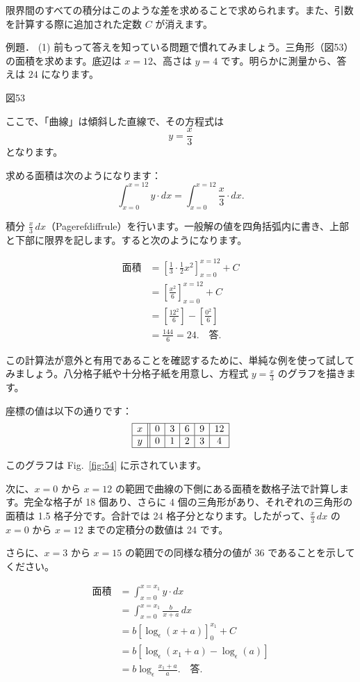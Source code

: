 \documentclass[a4paper,11pt,openany]{ltjsbook}
\newcommand{\Fig}[1]{Fig.~\ref{fig:#1}}
\begin{document}
限界間のすべての積分はこのような差を求めることで求められます。また、引数を計算する際に追加された定数 \(C\) が消えます。

例題．
(1) 前もって答えを知っている問題で慣れてみましょう。三角形（図53）の面積を求めます。底辺は \(x = 12\)、高さは \(y = 4\) です。明らかに測量から、答えは \(24\) になります。

図53

ここで、「曲線」は傾斜した直線で、その方程式は
\[
y = \frac{x}{3}
\]
となります。

求める面積は次のようになります：
\[
\int^{x=12}_{x=0} y · dx = \int^{x=12}_{x=0} \frac{x}{3} · dx.
\]

積分 $\frac{x}{3}\, dx$（Pageref{diffrule}）を行います。一般解の値を四角括弧内に書き、上部と下部に限界を記します。すると次のようになります。

\begin{align*}
面積 &= \left[ \frac{1}{3} · \frac{1}{2} x^2 \right]^{x=12}_{x=0} + C \\
  &= \left[ \frac{x^2}{6} \right]^{x=12}_{x=0} + C \\
  &= \left[ \frac{12^2}{6} \right] - \left[ \frac{0^2}{6} \right] \\
  &= \frac{144}{6} = 24.\quad \textit{答}.
\end{align*}

この計算法が意外と有用であることを確認するために、単純な例を使って試してみましょう。八分格子紙や十分格子紙を用意し、方程式 $y = \frac{x}{3}$ のグラフを描きます。

座標の値は以下の通りです：
\[
\begin{array} {|c|| *{5}{c|}}
\hline
x & 0 & 3 & 6 & 9 & 12 \\
\hline
y & 0 & 1 & 2 & 3 & 4 \\
\hline
\end{array}
\]

このグラフは \Fig{54} に示されています。

次に、$x = 0$ から $x = 12$ の範囲で曲線の下側にある面積を数格子法で計算します。完全な格子が 18 個あり、さらに 4 個の三角形があり、それぞれの三角形の面積は 1.5 格子分です。合計では 24 格子分となります。したがって、$\frac{x}{3}\, dx$ の $x = 0$ から $x = 12$ までの定積分の数値は 24 です。

さらに、$x = 3$ から $x = 15$ の範囲での同様な積分の値が 36 であることを示してください。

\begin{align*}
面積
  &= \int^{x=x_1}_{x=0} y · dx \\
   &= \int^{x=x_1}_{x=0} \frac{b}{x+a}\, dx  \\
  &= b \left[\log_\epsilon(x + a) \right]^{x_1}_{0} + C  \\
  &= b \left[\log_\epsilon(x_1 + a) - \log_\epsilon(a)\right]  \\
  &= b \log_\epsilon \frac{x_1 + a}{a}.\quad \textit{答}.
\end{align*}
\end{document}
